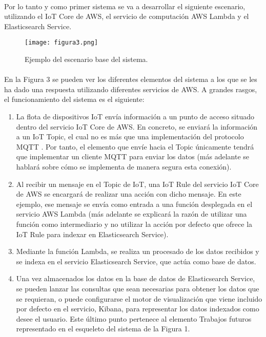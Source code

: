 \documentclass[../../memoria.tex]{subfiles}
\begin{document}
\paragraph{}
Por lo tanto y como primer sistema se va a desarrollar el siguiente escenario, utilizando el IoT Core de AWS, el servicio de computación AWS Lambda y el Elasticsearch Service.

\begin{figure}[H]
    \centering
    \texttt{[image: figura3.png]}
    \caption{Ejemplo del escenario base del sistema.}
    \label{fig:figura3}
\end{figure}

\paragraph{}
En la Figura 3 se pueden ver los diferentes elementos del sistema a los que se les ha dado una respuesta utilizando diferentes servicios de AWS. A grandes rasgos, el funcionamiento del sistema es el siguiente:

\begin{enumerate}
    \item La flota de dispositivos IoT envía información a un punto de acceso situado dentro del servicio IoT Core de AWS. En concreto, se enviará la información a un IoT Topic, el cual no es más que una implementación del protocolo MQTT \cite{mqtt}. Por tanto, el elemento que envíe hacia el Topic únicamente tendrá que implementar un cliente MQTT para enviar los datos (más adelante se hablará sobre cómo se implementa de manera segura esta conexión).

    \item Al recibir un mensaje en el Topic de IoT, una IoT Rule del servicio IoT Core de AWS se encargará de realizar una acción con dicho mensaje. En este ejemplo, ese mensaje se envía como entrada a una función desplegada en el servicio AWS Lambda (más adelante se explicará la razón de utilizar una función como intermediario y no utilizar la acción por defecto que ofrece la IoT Rule para indexar en Elasticsearch Service).

    \item Mediante la función Lambda, se realiza un procesado de los datos recibidos y se indexa en el servicio Elasticsearch Service, que actúa como base de datos.

    \item Una vez almacenados los datos en la base de datos de Elasticsearch Service, se pueden lanzar las consultas que sean necesarias para obtener los datos que se requieran, o puede configurarse el motor de visualización que viene incluido por defecto en el servicio, Kibana, para representar los datos indexados como desee el usuario. Este último punto pertenece al elemento Trabajos futuros representado en el esqueleto del sistema de la Figura 1.
\end{enumerate}
\end{document}
